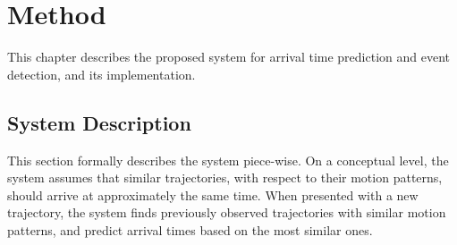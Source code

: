 
\chapter{Method}
\label{cha:method}
This chapter describes the proposed system for arrival time prediction
and event detection, and its implementation.

\section{System Description}
This section formally describes the system piece-wise. On a conceptual
level, the system assumes that similar trajectories, with respect to their motion patterns, should arrive at
approximately the same time. When presented with a new trajectory, the system
finds previously observed trajectories with similar motion patterns,
and predict arrival times based on the most similar ones.

